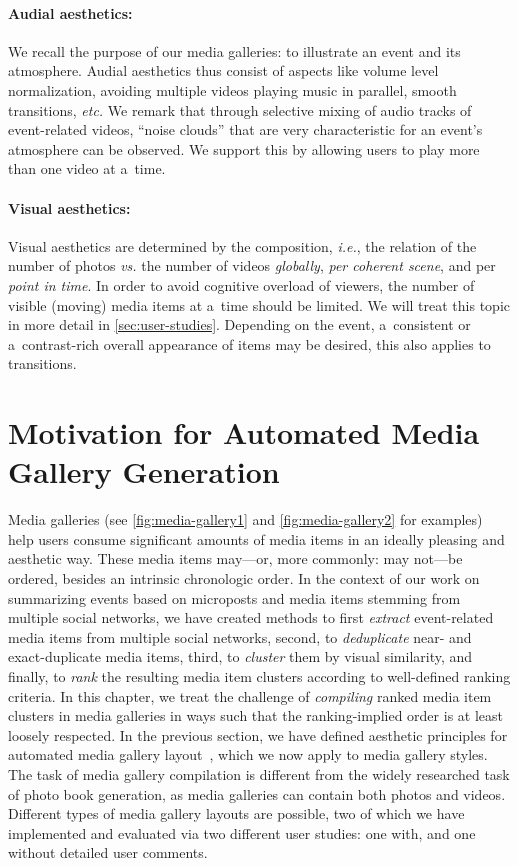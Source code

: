 \paragraph{Audial aesthetics:}

We recall the purpose of our media galleries:
to illustrate an event and its atmosphere.
Audial aesthetics thus consist of aspects like volume level normalization,
avoiding multiple videos playing music in parallel, smooth transitions, \emph{etc.}
We remark that through selective mixing of audio tracks
of event-related videos, ``noise clouds''
that are very characteristic
for an event's atmosphere can be observed.
We support this by allowing users to play more than one video at a~time.

\paragraph{Visual aesthetics:}

Visual aesthetics are determined by the composition, \emph{i.e.},
the relation of the number of photos \emph{vs.} the number of videos \emph{globally},
\emph{per coherent scene}, and per \emph{point in time}.
In order to avoid cognitive overload of viewers,
the number of visible (moving) media items
at a~time should be limited.
We will treat this topic in more detail in \autoref{sec:user-studies}.
Depending on the event, a~consistent or a~contrast-rich overall
appearance of items may be desired,
this also applies to transitions.

\section{Motivation for Automated Media Gallery Generation}
\label{sec:motivation-chapter-8}

Media galleries (see \autoref{fig:media-gallery1} and \autoref{fig:media-gallery2}
for examples)
help users consume significant
amounts of media items in an ideally pleasing and aesthetic way.
These media items may---or, more commonly: may not---be ordered,
besides an intrinsic chronologic order.
In the context of our work on summarizing events
based on microposts and media items stemming from
multiple social networks, we have created methods
to first \emph{extract} event-related media items
from multiple social networks, second, to
\emph{deduplicate} near- and exact-duplicate media items,
third, to \emph{cluster} them by visual similarity, and
finally, to \emph{rank} the resulting media item clusters
according to well-defined ranking criteria.
In this chapter, we treat the challenge of \emph{compiling}
ranked media item clusters in media galleries in ways
such that the ranking-implied order is at least loosely respected.
In the previous section, we have defined
aesthetic principles for automated media gallery layout~\cite{steiner2012definingaesthetic},
which we now apply to media gallery styles.
The task of media gallery compilation is different
from the widely researched task of photo book generation,
as media galleries can contain both photos and videos.
Different types of media gallery layouts are possible,
two of which we have implemented and evaluated via two different user studies:
one with, and one without detailed user comments.

